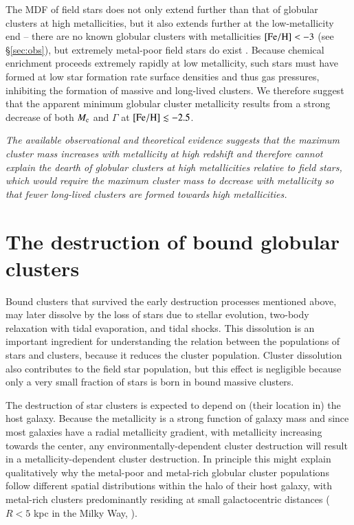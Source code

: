 \documentclass{aa}
\begin{document}
The MDF of field stars does not only extend further than that of globular clusters at high metallicities, but it also extends further at the low-metallicity end -- there are no known globular clusters with metallicities ${\rm [Fe/H]}<-3$ (see \S\ref{sec:obs}), but extremely metal-poor field stars do exist \citep[e.g.][]{frebel15}. Because chemical enrichment proceeds extremely rapidly at low metallicity, such stars must have formed at low star formation rate surface densities and thus gas pressures, inhibiting the formation of massive and long-lived clusters. We therefore suggest that the apparent minimum globular cluster metallicity results from a strong decrease of both $M_{\rm c}$ and $\Gamma$ at ${\rm [Fe/H]}\lesssim-2.5$.

{\it The available observational and theoretical evidence suggests that the maximum cluster mass increases with metallicity at high redshift and therefore cannot explain the dearth of globular clusters at high metallicities relative to field stars, which would require the maximum cluster mass to decrease with metallicity so that fewer long-lived clusters are formed towards high metallicities.}







\section{The destruction of bound globular clusters} \label{sec:destruc}

Bound clusters that survived the early destruction processes mentioned above, may later dissolve by 
the loss of stars due to stellar evolution, two-body relaxation with tidal evaporation, and tidal shocks.
This dissolution is an important 
ingredient for understanding the relation between the populations of stars and clusters, because 
it reduces the cluster population. Cluster dissolution also contributes to the field star population,
but this effect is negligible because only a very small fraction of stars is born in  
bound massive clusters.

The destruction of star clusters is expected to depend on (their location in) the host galaxy. 
Because the metallicity is a strong function of galaxy mass and since most galaxies have a radial metallicity gradient, with metallicity increasing towards 
the center, any environmentally-dependent cluster destruction will result in a metallicity-dependent 
cluster destruction. In principle this might explain qualitatively why
the metal-poor and metal-rich globular cluster populations follow different spatial distributions 
within the halo of their host galaxy, with metal-rich clusters predominantly residing at small 
galactocentric distances ($ R < 5$ kpc in the Milky Way, \citealt{harris96}). 
\end{document}
